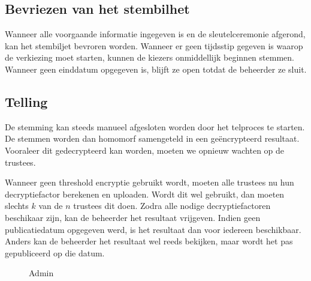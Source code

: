 \subsection{Bevriezen van het stembilhet}

Wanneer alle voorgaande informatie ingegeven is en de sleutelceremonie afgerond, kan het stembiljet bevroren worden. Wanneer er geen tijdsstip gegeven is waarop de verkiezing moet starten, kunnen de kiezers onmiddellijk beginnen stemmen. Wanneer geen einddatum opgegeven is, blijft ze open totdat de beheerder ze sluit.

\subsection{Telling}


De stemming kan steeds manueel afgesloten worden door het telproces te starten. De stemmen worden dan homomorf samengeteld in een geëncrypteerd resultaat. Vooraleer dit gedecrypteerd kan worden, moeten we opnieuw wachten op de trustees.

\npar Wanneer geen threshold encryptie gebruikt wordt, moeten alle trustees nu hun decryptiefactor berekenen en uploaden. Wordt dit wel gebruikt, dan moeten slechts $k$ van de $n$ trustees dit doen. Zodra alle nodige decryptiefactoren beschikaar zijn, kan de beheerder het resultaat vrijgeven. Indien geen publicatiedatum opgegeven werd, is het resultaat dan voor iedereen beschikbaar. Anders kan de beheerder het resultaat wel reeds bekijken, maar wordt het pas gepubliceerd op die datum.

\begin{figure}
  \caption{Admin}
  \label{fig:proc:elections_admin}
\end{figure}
